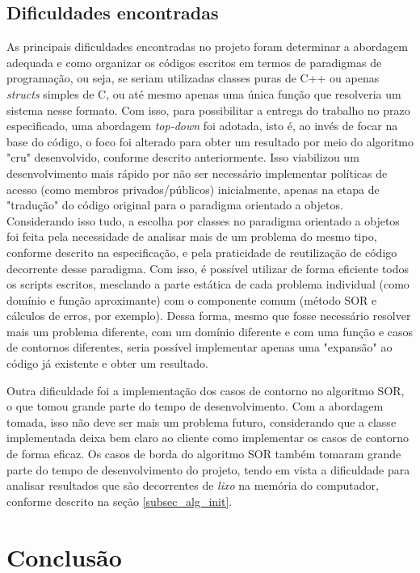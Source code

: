 \documentclass[oneside]{abntex2}
\begin{document}
\section{Dificuldades encontradas}
As principais dificuldades encontradas no projeto foram determinar a abordagem adequada e como organizar os códigos escritos em termos de paradigmas de programação, ou seja, se seriam utilizadas classes puras de C++ ou apenas \textit{structs} simples de C, ou até mesmo apenas uma única função que resolveria um sistema nesse formato. Com isso, para possibilitar a entrega do trabalho no prazo especificado, uma abordagem \textit{top-down} foi adotada, isto é, ao invés de focar na base do código, o foco foi alterado para obter um resultado por meio do algoritmo "cru" desenvolvido, conforme descrito anteriormente. Isso viabilizou um desenvolvimento mais rápido por não ser necessário implementar políticas de acesso (como membros privados/públicos) inicialmente, apenas na etapa de "tradução" do código original para o paradigma orientado a objetos. Considerando isso tudo, a escolha por classes no paradigma orientado a objetos foi feita pela necessidade de analisar mais de um problema do mesmo tipo, conforme descrito na especificação, e pela praticidade de reutilização de código decorrente desse paradigma. Com isso, é possível utilizar de forma eficiente todos os scripts escritos, mesclando a parte estática de cada problema individual (como domínio e função aproximante) com o componente comum (método SOR e cálculos de erros, por exemplo). Dessa forma, mesmo que fosse necessário resolver mais um problema diferente, com um domínio diferente e com uma função e casos de contornos diferentes, seria possível implementar apenas uma "expansão" ao código já existente e obter um resultado.

Outra dificuldade foi a implementação dos casos de contorno no algoritmo SOR, o que tomou grande parte do tempo de desenvolvimento. Com a abordagem tomada, isso não deve ser mais um problema futuro, considerando que a classe implementada deixa bem claro ao cliente como implementar os casos de contorno de forma eficaz. Os casos de borda do algoritmo SOR também tomaram grande parte do tempo de desenvolvimento do projeto, tendo em vista a dificuldade para analisar resultados que são decorrentes de \textit{lixo} na memória do computador, conforme descrito na seção \ref{subsec_alg_init}.

\chapter{Conclusão} \label{sec_conc}
\end{document}
